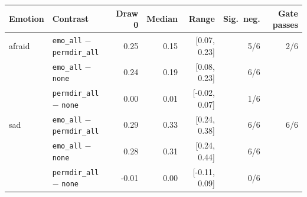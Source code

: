 \begin{tabular}{llrrrrr}
\toprule
Emotion & Contrast & Draw 0 & Median & Range & Sig.\ neg. & Gate passes \\
\midrule
afraid & \texttt{emo\_all} $-$ \texttt{permdir\_all} & 0.25 & 0.15 & [0.07, 0.23] & 5/6 & 2/6 \\
 & \texttt{emo\_all} $-$ \texttt{none} & 0.24 & 0.19 & [0.08, 0.23] & 6/6 &  \\
 & \texttt{permdir\_all} $-$ \texttt{none} & 0.00 & 0.01 & [-0.02, 0.07] & 1/6 &  \\
sad & \texttt{emo\_all} $-$ \texttt{permdir\_all} & 0.29 & 0.33 & [0.24, 0.38] & 6/6 & 6/6 \\
 & \texttt{emo\_all} $-$ \texttt{none} & 0.28 & 0.31 & [0.24, 0.44] & 6/6 &  \\
 & \texttt{permdir\_all} $-$ \texttt{none} & -0.01 & 0.00 & [-0.11, 0.09] & 0/6 &  \\
\bottomrule
\end{tabular}
